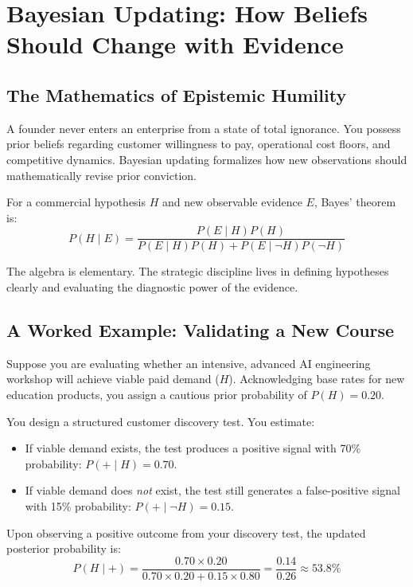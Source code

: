 \section{Bayesian Updating: How Beliefs Should Change with Evidence}

\subsection{The Mathematics of Epistemic Humility}

A founder never enters an enterprise from a state of total ignorance. You possess prior beliefs regarding customer willingness to pay, operational cost floors, and competitive dynamics. Bayesian updating formalizes how new observations should mathematically revise prior conviction.

For a commercial hypothesis $H$ and new observable evidence $E$, Bayes' theorem is:
\begin{equation}
P(H \mid E) = \frac{P(E \mid H) P(H)}{P(E \mid H) P(H) + P(E \mid \neg H) P(\neg H)}
\end{equation}

The algebra is elementary. The strategic discipline lives in defining hypotheses clearly and evaluating the diagnostic power of the evidence.

\subsection{A Worked Example: Validating a New Course}

Suppose you are evaluating whether an intensive, advanced AI engineering workshop will achieve viable paid demand ($H$). Acknowledging base rates for new education products, you assign a cautious prior probability of $P(H) = 0.20$.

You design a structured customer discovery test. You estimate:
\begin{itemize}[leftmargin=10pt,itemsep=1pt,topsep=1pt]
  \item If viable demand exists, the test produces a positive signal with 70\% probability: $P(+ \mid H) = 0.70$.
  \item If viable demand does \textit{not} exist, the test still generates a false-positive signal with 15\% probability: $P(+ \mid \neg H) = 0.15$.
\end{itemize}

Upon observing a positive outcome from your discovery test, the updated posterior probability is:
\begin{equation*}
P(H \mid +) = \frac{0.70 \times 0.20}{0.70 \times 0.20 + 0.15 \times 0.80} = \frac{0.14}{0.26} \approx 53.8\%
\end{equation*}

